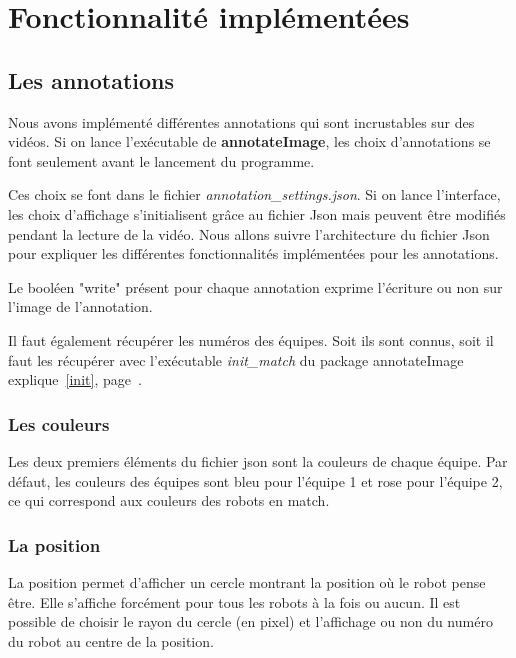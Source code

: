 \chapter{Fonctionnalité implémentées}

\section{Les annotations}

Nous avons implémenté différentes annotations qui sont 
incrustables sur des vidéos. Si on lance l'exécutable de 
\textbf{annotateImage}, les choix d'annotations se font seulement
avant le lancement du programme.

Ces choix se font dans le fichier
\textit{annotation\_settings.json}.
Si on lance l'interface, les choix d'affichage s'initialisent
grâce au fichier Json mais peuvent être modifiés pendant la
lecture de la vidéo. 
Nous allons suivre l'architecture du fichier Json pour expliquer
les différentes fonctionnalités implémentées pour les
annotations.
\bigskip

Le booléen "write" présent pour chaque annotation exprime
l'écriture ou non sur l'image de l'annotation.
\bigskip

Il faut également récupérer les numéros des équipes. Soit ils
sont connus, soit il faut les récupérer avec l'exécutable
\textit{init\_match} du package annotateImage
explique~\ref{init}, page~\pageref{init}.


\subsection{Les couleurs}

Les deux premiers éléments du fichier json sont la couleurs de 
chaque équipe. Par défaut, les couleurs des équipes sont bleu 
pour l'équipe 1 et rose pour l'équipe 2, ce qui correspond aux 
couleurs des robots en match.

\newpage

\subsection{La position}

La position permet d'afficher un cercle montrant la position où 
le robot pense être.
Elle s'affiche forcément pour tous les robots à la fois ou aucun.
Il est possible de choisir le rayon du cercle (en pixel) et
l'affichage ou non du numéro du robot au centre de la position. 
\bigskip

